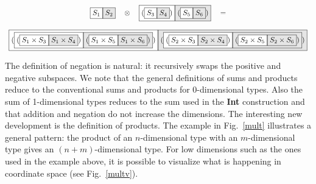 \documentclass[authoryear,preprint]{sigplanconf}
\newcommand{\nodet}[2]{\fcolorbox{black}{white}{$#1$}\fcolorbox{black}{gray!20}{$#2$}}
\begin{document}
\begin{figure*}
\[\begin{array}{c}
\nodet{S_1}{S_2}
\quad\otimes\quad
\nodet{(\nodet{S_3}{S_4})}{(\nodet{S_5}{S_6})} \quad= \\
\\
\nodet{(\nodet{{(\nodet{S_1 \times S_3}{S_1 \times S_4})}}
              {{(\nodet{S_1 \times S_5}{S_1 \times S_6})}})}
      {(\nodet{{(\nodet{S_2 \times S_3}{S_2 \times S_4})}}
              {{(\nodet{S_2 \times S_5}{S_2 \times S_6})}})}
\end{array}\]
\caption{\label{mult}Example of multiplication of two cubical sets.}
\end{figure*}

\noindent The definition of negation is natural: it recursively swaps the
positive and negative subspaces. We note that the general definitions of sums
and products reduce to the conventional sums and products for $0$-dimensional
types. Also the sum of 1-dimensional types reduces to the sum used in the
\textbf{Int} construction and that addition and negation do not increase the
dimensions. The interesting new development is the definition of
products. The example in Fig.~\ref{mult} illustrates a general pattern: the
product of an $n$-dimensional type with an $m$-dimensional type gives an
$(n+m)$-dimensional type. For low dimensions such as the ones used in the
example above, it is possible to visualize what is happening in coordinate
space (see Fig.~\ref{multv}).
\end{document}
